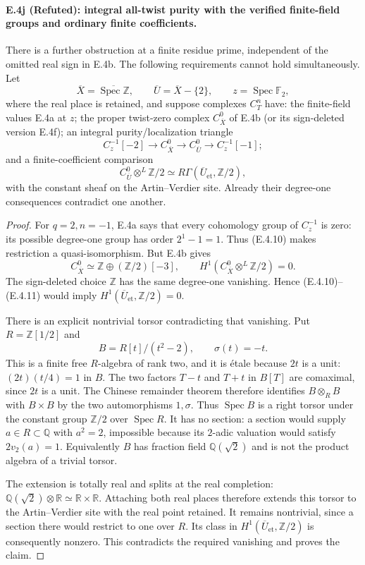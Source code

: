 \paragraph{E.4j (Refuted): integral all-twist purity with the verified finite-field groups and ordinary finite coefficients.}
There is a further obstruction at a finite residue prime, independent
of the omitted real sign in E.4b. The following requirements
cannot hold simultaneously. Let
\[
 \overline X=\overline{\operatorname{Spec}\mathbb Z},\qquad
 \overline U=\overline X-\{2\},\qquad z=\operatorname{Spec}\mathbb F_2,
\]
where the real place is retained, and suppose complexes $C_T^n$ have:
the finite-field values E.4a at $z$; the proper twist-zero complex
$C_{\overline X}^0$ of E.4b (or its sign-deleted version E.4f);
an integral purity/localization triangle
\[
 C_z^{-1}[-2]\longrightarrow C_{\overline X}^0
       \longrightarrow C_{\overline U}^0\longrightarrow C_z^{-1}[-1];
 \tag{E.4.10}
\]
and a finite-coefficient comparison
\[
 C_{\overline U}^0\otimes^L\mathbb Z/2
   \simeq R\Gamma(\overline U_{\mathrm{et}},\mathbb Z/2),
 \tag{E.4.11}
\]
with the constant sheaf on the Artin--Verdier site. Already their
degree-one consequences contradict one another.

\begin{proof}
For $q=2,n=-1$, E.4a says that every cohomology group of $C_z^{-1}$
is zero: its possible degree-one group has order $2^1-1=1$.
Thus (E.4.10) makes restriction a quasi-isomorphism.
But E.4b gives
\[
 C_{\overline X}^0\simeq
 \mathbb Z\oplus(\mathbb Z/2)[-3],
 \qquad
 H^1(C_{\overline X}^0\otimes^L\mathbb Z/2)=0.
\]
The sign-deleted choice $\mathbb Z$ has the same degree-one vanishing.
Hence (E.4.10)--(E.4.11) would imply
$H^1(\overline U_{\mathrm{et}},\mathbb Z/2)=0$.

There is an explicit nontrivial torsor contradicting that vanishing.
Put $R=\mathbb Z[1/2]$ and
\[
 B=R[t]/(t^2-2),\qquad \sigma(t)=-t.
\]
This is a finite free $R$-algebra of rank two, and it is \'etale
because $2t$ is a unit: $(2t)(t/4)=1$ in $B$.
The two factors $T-t$ and $T+t$ in $B[T]$ are comaximal, since
$2t$ is a unit. The Chinese remainder theorem therefore identifies
$B\otimes_R B$ with $B\times B$ by the two automorphisms
$1,\sigma$. Thus $\operatorname{Spec}B$ is a right torsor under the
constant group $\mathbb Z/2$ over $\operatorname{Spec}R$.
It has no section: a section would supply $a\in R\subset\mathbb Q$
with $a^2=2$, impossible because its $2$-adic valuation would satisfy
$2v_2(a)=1$. Equivalently $B$ has fraction field $\mathbb Q(\sqrt2)$
and is not the product algebra of a trivial torsor.

The extension is totally real and splits at the real completion:
$\mathbb Q(\sqrt2)\otimes\mathbb R\simeq\mathbb R\times\mathbb R$.
Attaching both real places therefore extends this torsor to the
Artin--Verdier site with the real point retained. It remains nontrivial,
since a section there would restrict to one over $R$.
Its class in $H^1(\overline U_{\mathrm{et}},\mathbb Z/2)$ is consequently
nonzero. This contradicts the required vanishing and proves the claim.
\end{proof}

